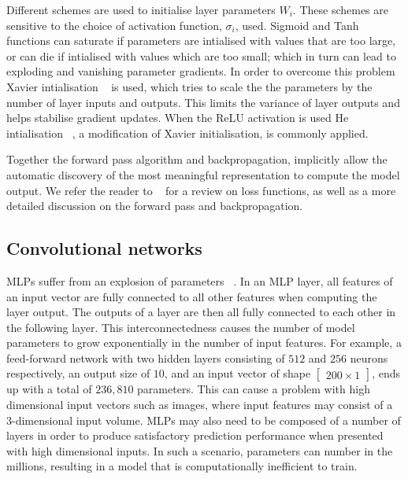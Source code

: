 \medskip
\noindent Different schemes are used to initialise layer parameters $ W_i $. These schemes are sensitive to the choice of activation function, $ \sigma_i $, used. Sigmoid and Tanh functions can saturate if parameters are intialised with values that are too large, or can die if intialised with values which are too small; which in turn can lead to exploding and vanishing parameter gradients. In order to overcome this problem Xavier intialisation \unskip ~\citep{glorot2010understanding} is used, which tries to scale the the parameters by the number of layer inputs and outputs. This limits the variance of layer outputs and helps stabilise gradient updates. When the ReLU activation is used He intialisation \unskip ~\citep{he2015delving}, a modification of Xavier initialisation, is commonly applied. \par

\noindent Together the forward pass algorithm and backpropagation, implicitly allow the automatic discovery of the most meaningful representation to compute the model output. We refer the reader to \unskip ~\citep{Goodfellow-et-al-2016} for a review on loss functions, as well as a more detailed discussion on the forward pass and backpropagation. 



\subsection{Convolutional networks}

MLPs suffer from an explosion of parameters  ~\citep{krizhevsky2012imagenet}. In an MLP layer, all features of an input vector are fully connected to all other features when computing the layer output. The outputs of a layer are then all fully connected to each other in the following layer. This interconnectedness causes the number of model parameters to grow exponentially in the number of input features. For example, a feed-forward network with two hidden layers consisting of $512$ and $256$ neurons respectively, an output size of $10$, and an input vector of shape $\left [ \begin{matrix} 200 \times 1 \end{matrix} \right] $, ends up with a total of $236,810$ parameters. This can cause a problem with high dimensional input vectors such as images, where input features may consist of a 3-dimensional input volume. MLPs may also need to be composed of a number of layers in order to produce satisfactory prediction performance when presented with high dimensional inputs. In such a scenario, parameters can number in the millions, resulting in a model that is computationally inefficient to train. \par

